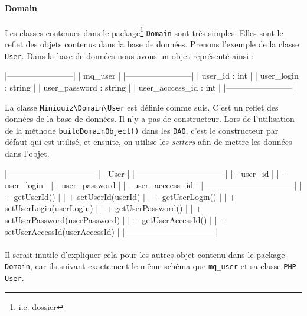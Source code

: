\documentclass[12pt]{article}
\begin{document}
        \paragraph{Domain} Les classes contenues dans le package\footnote{i.e. dossier} \verb+Domain+ sont très simples. Elles sont le reflet des objets contenus dans la base de données. Prenons l'exemple de la classe \verb+User+. Dans la base de données nous avons un objet représenté ainsi :
        
        \begin{verbatimtab}
        |------------------------|
        |         mq_user        |
        |------------------------|
        | user_id : int          |
        | user_login : string    |
        | user_password : string |
        | user_acccess_id : int  |
        |------------------------|
        \end{verbatimtab} 
        
        La classe \verb+Miniquiz\Domain\User+ est définie comme suis. C'est un reflet des données de la base de données. Il n'y a pas de constructeur. Lors de l'utilisation de la méthode \verb+buildDomainObject()+ dans les \verb+DAO+, c'est le constructeur par défaut qui est utilisé, et ensuite, on utilise les \emph{setters} afin de mettre les données dans l'objet.
        \begin{verbatimtab}
        |---------------------------------|
        |           User                  |
        |---------------------------------|
        | - user_id                       |
        | - user_login                    |
        | - user_password                 |
        | - user_acccess_id               |
        |---------------------------------|
        | + getUserId()                   |
        | + setUserId(userId)             |
        | + getUserLogin()                |
        | + setUserLogin(userLogin)       |
        | + getUserPassword()             |
        | + setUserPassword(userPassword) |
        | + getUserAccessId()             |
        | + setUserAccessId(userAccessId) |
        |---------------------------------|
        \end{verbatimtab}
        
        \paragraph{} Il serait inutile d'expliquer cela pour les autres objet contenu dans le package \verb+Domain+, car ils suivant exactement le même schéma que \verb+mq_user+ et sa classe \texttt{PHP} \verb+User+.        
        
\end{document}
